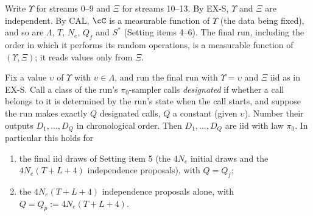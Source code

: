 \documentclass[11pt]{report}
\begin{document}
Write $\Upsilon$ for streams 0--9 and $\Xi$ for streams 10--13. By EX-S, $\Upsilon$ and $\Xi$ are independent. By CAL,
$\cC$ is a measurable function of $\Upsilon$ (the data being fixed), and so are $\Lambda$, $T$, $N_e$, $Q_f$ and $S^*$
(Setting items 4--6). The final run, including the order in which it performs its random operations, is a measurable
function of $(\Upsilon,\Xi)$; it reads values only from $\Xi$.

\begin{T11proposition}\label{T11:prop:iid}
Fix a value $\upsilon$ of $\Upsilon$ with $\upsilon\in\Lambda$, and run the final run with $\Upsilon=\upsilon$ and
$\Xi$ iid as in EX-S. Call a class of the run's $\pi_0$-sampler calls \emph{designated} if whether a call belongs to it
is determined by the run's state when the call starts, and suppose the run makes exactly $Q$ designated calls, $Q$ a
constant (given $\upsilon$). Number their outputs $D_1,\dots,D_Q$ in chronological order. Then $D_1,\dots,D_Q$ are iid
with law $\pi_0$. In particular this holds for
\begin{enumerate}[label=(\alph*)]
\item the final iid draws of Setting item 5 (the $4N_e$ initial draws and the $4N_e(T+L+4)$ independence proposals),
with $Q=Q_f$;
\item the $4N_e(T+L+4)$ independence proposals alone, with $Q=Q_p:=4N_e(T+L+4)$.
\end{enumerate}
\end{T11proposition}
\end{document}
